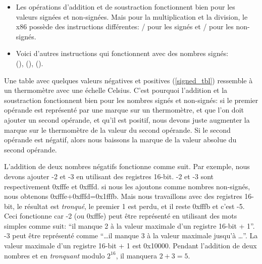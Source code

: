 \begin{itemize}
\item
	Les opérations d'addition et de soustraction fonctionnent bien pour les valeurs signées et non-signées.
	Mais pour la multiplication et la division, le x86 possède des instructions différentes:
	/ pour les signés et / pour les non-signés.
\item
	Voici d'autres instructions qui fonctionnent avec des nombres signés:\\
	 (),  (),  ().
\end{itemize}

Une table avec quelques valeurs négatives et positives (\ref{signed_tbl}) ressemble
à un thermomètre avec une échelle Celsius.
C'est pourquoi l'addition et la soustraction fonctionnent bien pour les nombres signés
et non-signés:
si le premier opérande est représenté par une marque sur un thermomètre, et que l'on
doit ajouter un second opérande, et qu'il est positif, nous devons juste augmenter
la marque sur le thermomètre de la valeur du second opérande.
Si le second opérande est négatif, alors nous baissons la marque de la valeur absolue
du second opérande.

L'addition de deux nombres négatifs fonctionne comme suit.
Par exemple, nous devons ajouter -2 et -3 en utilisant des registres 16-bit.
-2 et -3 sont respectivement 0xfffe et 0xfffd.
si nous les ajoutons comme nombres non-signés, nous obtenons 0xfffe+0xfffd=0x1fffb.
Mais nous travaillons avec des registres 16-bit, le résultat est \emph{tronqué},
le premier 1 est perdu, et il reste 0xfffb et c'est -5.
Ceci fonctionne car -2 (ou 0xfffe) peut être représenté en utilisant des mots simples
comme suit:
``il manque 2 à la valeur maximale d'un registre 16-bit + 1''.
-3 peut être représenté comme ``\dots il manque 3 à la valeur maximale jusqu'à \dots''.
La valeur maximale d'un registre 16-bit + 1 est 0x10000.
Pendant l'addition de deux nombres et en \emph{tronquant} modulo $2^{16}$, il manquera
$2+3=5$.




